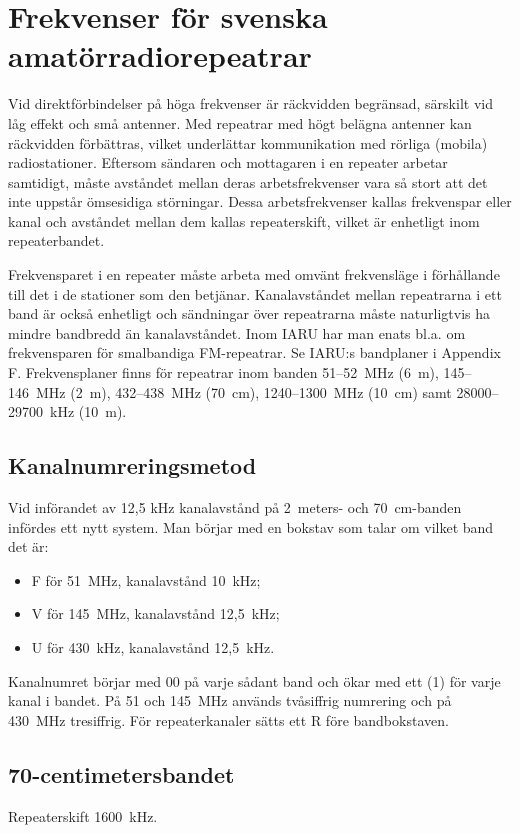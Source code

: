 \chapter{Frekvenser för svenska amatörradiorepeatrar}
Vid direktförbindelser på höga frekvenser är räckvidden begränsad,
särskilt vid låg effekt och små antenner.
Med repeatrar med högt belägna antenner kan räckvidden förbättras,
vilket underlättar kommunikation med rörliga (mobila) radiostationer.
Eftersom sändaren och mottagaren i en repeater arbetar samtidigt, måste
avståndet mellan deras arbetsfrekvenser vara så stort att det inte uppstår
ömsesidiga störningar.
Dessa arbetsfrekvenser kallas frekvenspar eller kanal och avståndet mellan dem
kallas repeaterskift, vilket är enhetligt inom repeaterbandet.

Frekvensparet i en repeater måste arbeta med omvänt frekvensläge i förhållande
till det i de stationer som den betjänar.
Kanalavståndet mellan repeatrarna i ett band är också enhetligt och sändningar
över repeatrarna måste naturligtvis ha mindre bandbredd än kanalavståndet.
Inom IARU har man enats bl.a. om frekvensparen för smalbandiga FM-repeatrar.
Se IARU:s bandplaner i Appendix F.
Frekvensplaner finns för repeatrar inom banden 51--52~MHz (6~m), 145--146~MHz
(2~m), 432--438~MHz (70~cm), 1240--1300~MHz (10~cm) samt 28000--29700~kHz (10~m).

\section{Kanalnumreringsmetod}
Vid införandet av 12,5 kHz kanalavstånd på 2~meters- och 70~cm-banden infördes
ett nytt system.
Man börjar med en bokstav som talar om vilket band det är:
\begin{itemize}
  \item F för 51~MHz, kanalavstånd 10~kHz;
  \item V för 145~MHz, kanalavstånd 12,5~kHz;
  \item U för 430~kHz, kanalavstånd 12,5~kHz.
\end{itemize}
Kanalnumret börjar med 00 på varje sådant band och ökar med ett (1) för varje
kanal i bandet.
På 51 och 145~MHz används tvåsiffrig numrering och på 430~MHz tresiffrig.
För repeaterkanaler sätts ett R före bandbokstaven.

\section{70-centimetersbandet}
Repeaterskift 1600~kHz.

